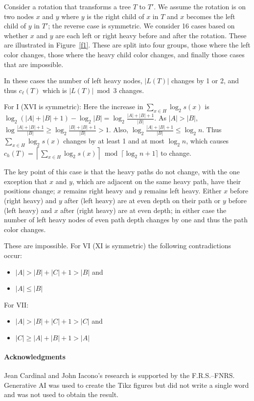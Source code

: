 \documentclass[a4paper]{article}
\newcommand{\cac}{olive}
\newcommand{\cbc}{teal}
\newcommand{\ccc}{orange}
\newcommand{\cdc}{purple}
\renewenvironment{description}%
{
\begin{basedescript}{
\desclabelstyle{\nextlinelabel}
\renewcommand{\makelabel}[1]{%
\parbox[b]{\columnwidth}{\bfseries##1}%
}%
\desclabelwidth{2em}}}
{
\end{basedescript}
}
\begin{document}
Consider a rotation that transforms a tree $T$ to $T'$. We assume the rotation is on two nodes $x$ and $y$ where $y$ is the right child of $x$ in $T$ and $x$ becomes the left child of $y$ in $T'$; the reverse case is symmetric. We consider 16 cases based on whether $x$ and $y$ are each left or right heavy before and after the rotation. These are illustrated in Figure~\ref{f1}. These are split into four groups, those where the left color changes, those where the heavy child color changes, and finally those cases that are impossible.

\begin{description}
    \item[\textcolor{\cac}{Cases II-V, VIII, IX, XII-XV (Left color changes)}] In these cases the number of left heavy nodes, $|L(T)|$ changes by 1 or 2, and thus $c_\ell(T)$ which is $|L(T)| \bmod 3$ changes.
    \item[\textcolor{\cbc}{Cases I and XVI (Heavy child color changes)}] For I (XVI is symmetric): Here the increase in $\sum_{x \in H} \log_2 s(x)$ is $\log_2 (|A|+|B|+1) - \log_2 |B| = \log_2 \frac{|A|+|B|+1}{|B|}$. 
    As $|A|>|B|$, $\log \frac{|A|+|B|+1}{|B|}\geq \log_2 \frac{|B|+|B|+1}{|B|}>1$. Also, $\log_2 \frac{|A|+|B|+1}{|B|}\leq \log_2 n$. Thus $\sum_{x \in H} \log_2 s(x)$ changes by at least 1 and at most $\log_2 n$, which causes $c_h(T) = \left\lceil  \sum_{x \in H} \log_2 s(x) \right\rceil \bmod \lceil \log_2n+1 \rceil$ to change.
    \item[\textcolor{\cdc}{Case X}] The key point of this case is that the heavy paths do not change, with the one exception that $x$ and $y$, which are adjacent on the same heavy path, have their positions change; $x$ remains right heavy and $y$ remains left heavy. Either $x$ before (right heavy) and $y$ after (left heavy) are at even depth on their path or $y$ before (left heavy) and $x$ after (right heavy) are at even depth; in either case the number of left heavy nodes of even path depth changes by one and thus the path color changes.
    \item[\textcolor{\ccc}{Cases VI, VII and XI (Impossible)}] These are impossible. For VI (XI is symmetric) the following contradictions occur:
    \begin{itemize}[topsep=0pt]
        \item $|A|>|B|+|C|+1>|B|$ and
        \item $|A|\leq |B|$
    \end{itemize}
    For VII:
      \begin{itemize}[topsep=0pt]
        \item $|A|>|B|+|C|+1>|C|$ and
        \item $|C|\geq |A|+|B|+1>|A|$
    \end{itemize}  
\end{description}

\paragraph{Acknowledgments} Jean Cardinal and John Iacono's research is supported by the F.R.S.–FNRS. Generative AI was used to create the Tikz figures but did not write a single word and was not used to obtain the result.






\end{document}
